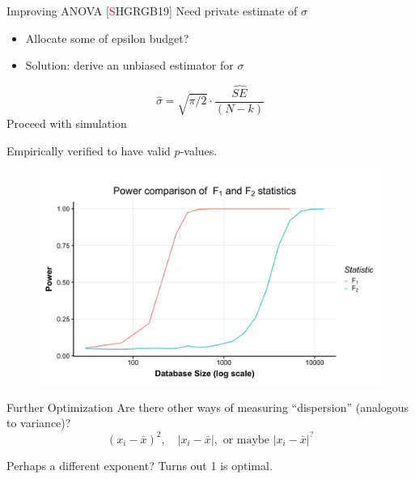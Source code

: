 \documentclass{beamer}
\begin{document}
\begin{frame}{Improving ANOVA [\textcolor{red}{S}HGRGB19]}
Need private estimate of $\sigma$ \pause
\begin{itemize}
	\item Allocate some of epsilon budget? \pause
	\item Solution: derive an unbiased estimator for $\sigma$ \pause
\end{itemize}
\bigskip

$$\hat{\sigma} = \sqrt{\pi/2} \cdot \frac{\widehat{SE}}{(N-k)} $$ \pause
\bigskip
Proceed with simulation
\bigskip

Empirically verified to have valid $p$-values.
\end{frame}


\begin{frame}{}
  \begin{figure}
  \includegraphics[scale=0.12]{images/f1-vs-f2}
  \end{figure}

\end{frame}

\begin{frame}{Further Optimization}
Are there other ways of measuring ``dispersion'' (analogous to variance)? 
$$(x_i - \bar{x})^2, \quad \lvert x_i - \bar{x} \rvert, \text{ or maybe }\lvert x_i - \bar{x} \rvert^?$$  \pause

Perhaps a different exponent? \pause Turns out 1 is optimal.
\end{frame}
\end{document}
